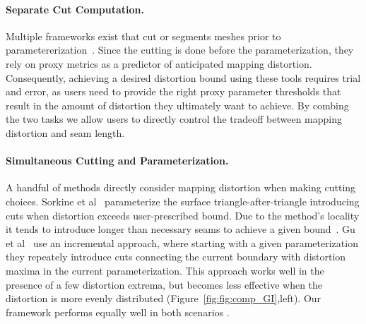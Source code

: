\paragraph{Separate Cut Computation.}
Multiple frameworks exist that cut or segments meshes prior to parametererization~\cite{Sheffer2002Seamster,Julius2005D,Snyder2003Multi,Levy2002,needMore}.
Since the cutting is done before the parameterization, they rely on proxy metrics as a predictor of anticipated mapping distortion. Consequently, achieving a desired distortion bound using these tools requires trial and error, as users need to provide the right proxy parameter thresholds that result in the amount of distortion they ultimately want to achieve. By combing the two tasks we allow users to directly control the tradeoff between mapping distortion and seam length. 

\paragraph{Simultaneous Cutting and Parameterization.}
A handful of methods directly consider mapping distortion when making cutting choices. 
Sorkine et al~ parameterize the surface triangle-after-triangle introducing cuts when distortion exceeds user-prescribed bound. Due to the method's locality it tends to introduce longer than necessary seams to achieve a given bound~\cite{Hormann2008,Poranne2017Autocuts}. 
Gu et al~ use an incremental approach, where starting with a given parameterization they  repeately introduce cuts connecting the current boundary with distortion maxima in the current parameterization.  This approach works well in the presence of a few distortion extrema, but becomes less effective when the distortion is more evenly distributed (Figure~\ref{fig:fig:comp_GI},left). Our framework performs equally well in both scenarios .  


